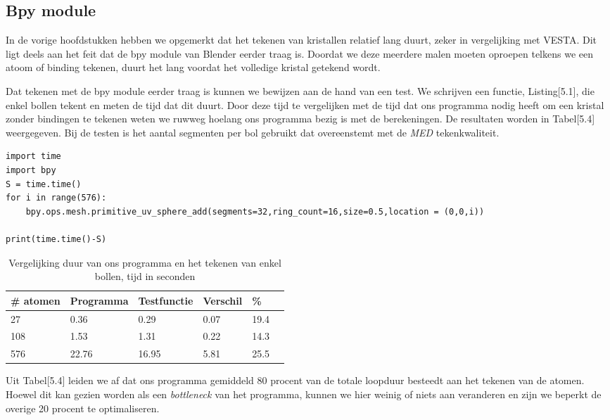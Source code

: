 \subsection{Bpy module}   
In de vorige hoofdstukken hebben we opgemerkt dat het tekenen van kristallen relatief lang duurt, zeker in vergelijking met VESTA. Dit ligt deels aan het feit dat de bpy module van Blender eerder traag is. Doordat we deze meerdere malen moeten oproepen telkens we een atoom of binding tekenen, duurt het lang voordat het volledige kristal getekend wordt.
\par
Dat tekenen met de bpy module eerder traag is kunnen we bewijzen aan de hand van een test. We schrijven een functie, Listing[5.1], die enkel bollen tekent en meten de tijd dat dit duurt. Door deze tijd te vergelijken met de tijd dat ons programma nodig heeft om een kristal zonder bindingen te tekenen weten we ruwweg hoelang ons programma bezig is met de berekeningen. De resultaten worden in Tabel[5.4] weergegeven. Bij de testen is het aantal segmenten per bol gebruikt dat overeenstemt met de \textit{MED} tekenkwaliteit.

\begin{lstlisting}[caption="Testprogramma dat een aantal bollen tekent en de duur meet"]
import time
import bpy
S = time.time()
for i in range(576):
    bpy.ops.mesh.primitive_uv_sphere_add(segments=32,ring_count=16,size=0.5,location = (0,0,i))
    
print(time.time()-S)
\end{lstlisting}

\begin{table}[H]
\begin{center}
\begin{tabular}{|l|l|l|l|l|l|}
\hline
\# atomen & Programma 	& Testfunctie	& Verschil & \%	\\ \hline
27  & 0.36    & 0.29 		& 0.07  	&	19.4 \\ \hline
108 & 1.53   	& 1.31 		& 0.22  	&	14.3 \\ \hline
576 & 22.76 	& 16.95 	& 5.81 		&	25.5 \\ \hline
\end{tabular}
\end{center}
\caption{Vergelijking duur van ons programma en het tekenen van enkel bollen, tijd in seconden}
\end{table}

Uit Tabel[5.4] leiden we af dat ons programma gemiddeld 80 procent van de totale loopduur besteedt aan het tekenen van de atomen. Hoewel dit kan gezien worden als een \textit{bottleneck} van het programma, kunnen we hier weinig of niets aan veranderen en zijn we beperkt de overige 20 procent te optimaliseren. 

